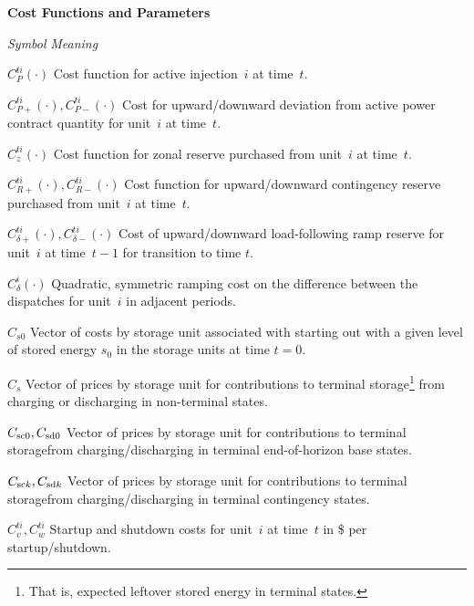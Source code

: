 \documentclass[12pt]{article}
\newcommand{\namelistlabel}[1]{\mbox{#1}\hfil}
\newenvironment{namelist}[1]{%
\begin{list}{}
  {
    \let\makelabel\namelistlabel
    \settowidth{\labelwidth}{#1}
    \setlength{\leftmargin}{1.1\labelwidth}
  }
 }{%
\end{list}}
\numberwithin{equation}{section}
\numberwithin{table}{section}
\numberwithin{figure}{section}
\begin{document}
\begin{namelist}{XXXXXXXXXX}
\item[]
\item[{\bf Cost Functions and Parameters}]
\item[\emph{Symbol}] \emph{Meaning}
\item[$C_P^{ti}(\cdot)$] Cost function for active injection~$i$ at time~$t$.
\item[$C_{P+}^{ti}(\cdot), C_{P-}^{ti}(\cdot)$] Cost for upward/downward deviation from active power contract quantity for unit~$i$ at time~$t$.
\item[$C_z^{ti}(\cdot)$] Cost function for zonal reserve purchased from unit~$i$ at time~$t$.
\item[$C_{R+}^{ti}(\cdot), C_{R-}^{ti}(\cdot)$] Cost function for upward/downward contingency reserve purchased from unit~$i$ at time~$t$.
\item[$C_{\delta+}^{ti}(\cdot),C_{\delta-}^{ti}(\cdot)$] Cost of upward/downward load-following ramp reserve for unit~$i$ at time~$t-1$ for transition to time $t$.
\item[$C_\delta^i(\cdot)$] Quadratic, symmetric ramping cost on the difference between the dispatches for unit~$i$ in adjacent periods.
\item[$C_{s0}$] Vector of costs by storage unit associated with starting out with a given level of stored energy $s_0$ in the storage units at time $t=0$.
\item[$C_{s}$] Vector of prices by storage unit for contributions to terminal storage\footnote{That is, expected leftover stored energy in terminal states.}  from charging or discharging in non-terminal states.
\item[$C_{\rm sc0}, C_{\rm sd0}$] Vector of prices by storage unit for contributions to terminal storage\footnotemark[\value{footnote}] from charging/discharging in terminal end-of-horizon base states.
\item[$C_{{\rm sc}k}, C_{{\rm sd}k}$] Vector of prices by storage unit for contributions to terminal storage\footnotemark[\value{footnote}] from charging/discharging in terminal contingency states.
\item[$C_v^{ti}, C_w^{ti}$] Startup and shutdown costs for unit~$i$ at time~$t$ in \$ per startup/shutdown.


\end{namelist}
\end{document}
